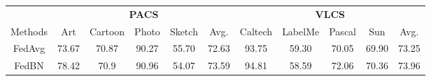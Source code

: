\documentclass{article}
\theoremstyle{plain}
\theoremstyle{definition}
\theoremstyle{remark}
\begin{document}
 \begin{table*}[!t]
 \centering
\begin{subtable}[!t]{1\linewidth}
	\scriptsize
	\centering
	\begin{tabular}{c||cccc|c||cccc|c}
		\toprule  
		&  \multicolumn{5}{c}{\textbf{PACS}} & \multicolumn{5}{c}{\textbf{VLCS}} \\
		\cmidrule{2-11}
	 Methods   & Art & Cartoon	& Photo & Sketch & Avg. & Caltech & LabelMe & Pascal & Sun & Avg.  \\
		\midrule
		FedAvg  \cite{mcmahan2017communication}  &73.67	&70.87	&90.27	&55.70&	72.63& 93.75	&59.30	&70.05	&69.90	&73.25\\	
				FedBN \cite{lifedbn}  & 78.42 &	70.9	 &90.96 &	54.07 &	73.59 & 94.81	&58.59&	72.06	&70.36&	73.96  \\	


\end{tabular}
\end{subtable}
\end{table*}
\end{document}

